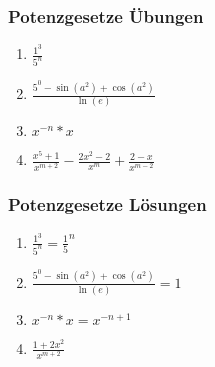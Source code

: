 \begin{frame}
    \frametitle{Potenzgesetze Übungen}
	\begin{enumerate}
		\setlength\itemsep{1em}
		\item $\frac{1^3}{5^n}$
		\item $\frac{5^0- \sin(a^2) + \cos(a^2)}{\ln(e)}$
		\item $x^{-n} * x$
		\item $\frac{x^5 +1}{x^{m+2}} - \frac{2x^2-2}{x^m} + \frac{2-x}{x^{m-2}}$
	\end{enumerate}
\end{frame}

\begin{frame}
    \frametitle{Potenzgesetze Lösungen}
	\begin{enumerate}
		\setlength\itemsep{1em}
		\item $\frac{1^3}{5^n} = \frac{1}{5}^n$
		\item $\frac{5^0- \sin(a^2) + \cos(a^2)}{\ln(e)} = 1$
		\item $x^{-n} * x = x^{-n+1}$
		\item $\frac{1+2x^2}{x^{m+2}}$
	\end{enumerate}
\end{frame}
